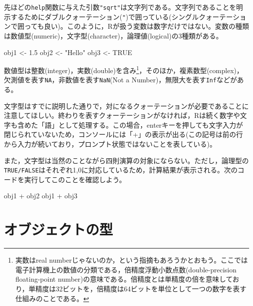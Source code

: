 \documentclass[
  a4paper,
]{ltjsbook}
\newenvironment{Shaded}{\begin{snugshade}}{\end{snugshade}}
\newcommand{\ConstantTok}[1]{\textcolor[rgb]{0.56,0.35,0.01}{#1}}
\newcommand{\FloatTok}[1]{\textcolor[rgb]{0.68,0.00,0.00}{#1}}
\newcommand{\NormalTok}[1]{\textcolor[rgb]{0.00,0.23,0.31}{#1}}
\newcommand{\OtherTok}[1]{\textcolor[rgb]{0.00,0.23,0.31}{#1}}
\newcommand{\SpecialCharTok}[1]{\textcolor[rgb]{0.37,0.37,0.37}{#1}}
\newcommand{\StringTok}[1]{\textcolor[rgb]{0.13,0.47,0.30}{#1}}
\begin{document}
先ほどの\texttt{help}関数に与えた引数\texttt{"sqrt"}は文字列である。文字列であることを明示するためにダブルクォーテーション(\texttt{"})で囲っている(シングルクォーテーションで囲っても良い)。このように，Rが扱う変数は数字だけではない。変数の種類は数値型(numeric)，文字型(character)，論理値(logical)の3種類がある。

\begin{Shaded}
\begin{Highlighting}[]
\NormalTok{obj1 }\OtherTok{\textless{}{-}} \FloatTok{1.5}
\NormalTok{obj2 }\OtherTok{\textless{}{-}} \StringTok{"Hello"}
\NormalTok{obj3 }\OtherTok{\textless{}{-}} \ConstantTok{TRUE}
\end{Highlighting}
\end{Shaded}

数値型は整数(integer)，実数(double)を含み\footnote{実数はreal
  numberじゃないのか，という指摘もあろうかとおもう。ここでは電子計算機上の数値の分類である，倍精度浮動小数点数(double-precision
  floating-point
  number)の意味である。倍精度とは単精度の倍を意味しており，単精度は32ビットを，倍精度は64ビットを単位として一つの数字を表す仕組みのことである。}，そのほか，複素数型(complex)，欠測値を表す\texttt{NA}，非数値を表す\texttt{NaN}(Not
a Number)，無限大を表す\texttt{Inf}などがある。

文字型はすでに説明した通りで，対になるクォーテーションが必要であることに注意してほしい。終わりを表すクォーテーションがなければ，Rは続く数字や文字も含めた「語」として処理する。この場合，enterキーを押しても文字入力が閉じられていないため，コンソールには「+」の表示が出る(この記号は前の行から入力が続いており，プロンプト状態ではないことを表している)。

また，文字型は当然のことながら四則演算の対象にならない。ただし，論理型の\texttt{TRUE/FALSE}はそれぞれ1,0に対応しているため，計算結果が表示される。次のコードを実行してこのことを確認しよう。

\begin{Shaded}
\begin{Highlighting}[]
\NormalTok{obj1 }\SpecialCharTok{+}\NormalTok{ obj2}
\NormalTok{obj1 }\SpecialCharTok{+}\NormalTok{ obj3}
\end{Highlighting}
\end{Shaded}

\section{オブジェクトの型}\label{ux30aaux30d6ux30b8ux30a7ux30afux30c8ux306eux578b}
\end{document}
